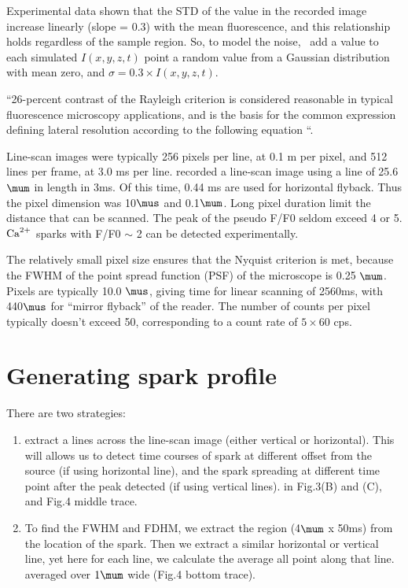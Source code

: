 Experimental data shown that the STD of the value in the recorded
image increase linearly (slope = 0.3) with the mean fluorescence, and
this relationship holds regardless of the sample region. So, to model
the noise,~\citep{izu1998} add a value to each simulated $I(x,y,z,t)$
point a random value from a Gaussian distribution with mean zero, and
$\sigma=0.3\times I(x,y,z,t)$.

``26-percent contrast of the Rayleigh criterion is considered reasonable in
typical fluorescence microscopy applications, and is the basis for the common
expression defining lateral resolution according to the following equation ``.

Line-scan images were typically 256 pixels per line, at 0.1 m per pixel, and
 512 lines per frame, at 3.0 ms per line. \citep{wier2000} recorded a line-scan
 image using a line of 25.6$\mum$ in length in 3ms. Of this
time, 0.44 ms are used for horizontal flyback. Thus the pixel dimension was
10$\mus$ and 0.1$\mum$. Long pixel duration limit the distance that can be
scanned. The peak of the pseudo F/F0 seldom exceed 4 or 5. ${\text{Ca}^{2+}}$ sparks with
F/F0 $\sim$ 2 can be detected experimentally.

The relatively small pixel size ensures that the Nyquist criterion is met,
because the FWHM of the point spread function (PSF) of the microscope is 0.25
$\mum$. Pixels are typically 10.0 $\mus$, giving time for linear scanning of
2560ms, with 440$\mus$ for ``mirror flyback'' of the reader. The number of
counts per pixel typically doesn't exceed 50, corresponding to a count rate of
$5\times 60$ cps.

\section{Generating spark profile}

There are two strategies: 
\begin{enumerate}
  \item extract a lines across the line-scan image (either
vertical or horizontal). This will allows us to detect time courses of spark at
different offset from the source (if using horizontal line), and the spark
spreading at different time point after the peak detected (if using vertical
lines). \citep{sobie2002tcas} in Fig.3(B) and (C), and Fig.4 middle trace.

  \item To find the FWHM and FDHM, we extract the region (4$\mum$ x 50ms) from
  the location of the spark. Then we extract a similar horizontal or vertical
  line, yet here for each line, we calculate the average all point along that
  line. \citep{sobie2002tcas} averaged over $1\mum$ wide (Fig.4 bottom trace).  
\end{enumerate}

